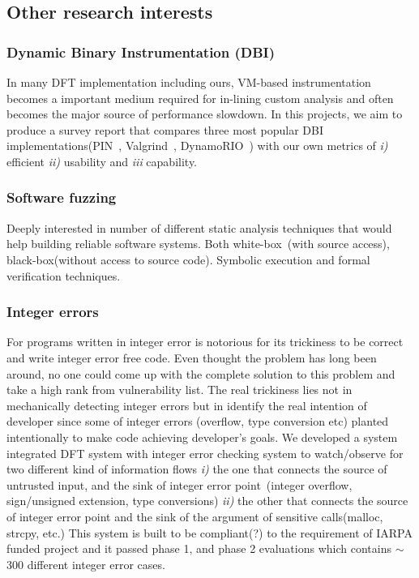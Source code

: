 \documentclass[letterpaper, 10pt]{article}
\begin{document}
\begin{small}
\subsection*{Other research interests} 
%
\subsubsection*{Dynamic Binary
Instrumentation (DBI)} In many DFT implementation including ours, VM-based
instrumentation becomes a important medium required for in-lining custom
analysis and often becomes the major source of performance slowdown. 
%
In this projects, we aim to produce a survey report that compares three most
popular DBI implementations(PIN~\cite{}, Valgrind~\cite{}, DynamoRIO~\cite{})
with our own metrics of {\it i)} efficient {\it ii)} usability and {\it iii}  
capability.

\subsubsection*{Software fuzzing}

Deeply interested in number of different static analysis techniques that would
help building reliable software systems. Both white-box~(with source access),
black-box(without access to source code). Symbolic execution and formal
verification techniques.

\subsubsection*{Integer errors} 

For programs written in integer error is notorious for its trickiness to be
correct and write integer error free code. Even thought the problem has long
been around, no one could come up with the complete solution to this problem
and take a high rank from vulnerability list. 
%
The real trickiness lies not in mechanically detecting integer errors but in
identify the real intention of developer since some of integer errors
(overflow, type conversion etc) planted intentionally to make code achieving
developer's goals.
%
We developed a system integrated DFT system with integer error checking system
to watch/observe for two different kind of information flows {\it i)} the one
that connects the source of untrusted input, and the sink of integer error
point~(integer overflow, sign/unsigned extension, type conversions) {\it ii)}
the other that connects the source of integer error point and the sink of the
argument of sensitive calls(malloc, strcpy, etc.)
% 
This system is built to be compliant(?) to the requirement of IARPA funded
project and it passed phase 1, and phase 2 evaluations which contains $\sim$
300 different integer error cases.

\end{small}
\newpage



\end{document}
